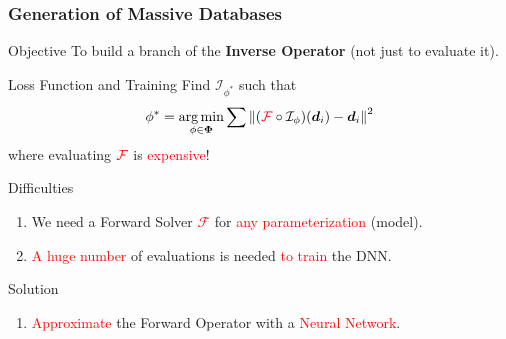 \begin{frame}
    \frametitle{Generation of Massive Databases}    
\vspace{-2mm}

\begin{block}{Objective}
	\centering
	To build a branch of the \textbf{Inverse Operator} (not just to evaluate it).
\end{block}

\begin{block}{Loss Function and Training}
Find $\mathcal{I}_{\phi^*}$ such that
\[
\phi^* = \operatorname*{arg\,min}_{\phi \in \boldsymbol{\Phi}} \sum \left\| (\textcolor{red}{\mathcal{F}} \circ \mathcal{I}_{\phi})(\boldsymbol{d}_i) - \boldsymbol{d}_i \right\|^2
\]
where evaluating $\textcolor{red}{\mathcal{F}}$ is \textcolor{red}{expensive}!
\end{block}
    
\begin{block}{Difficulties}
    \begin{enumerate}
        \item We need a Forward Solver \textcolor{red}{$\mathcal{F}$} for \textcolor{red}{any parameterization} (model).
        \item \textcolor{red}{A huge number} of evaluations is needed \textcolor{red}{to train} the DNN.
    \end{enumerate}
\end{block}

\begin{block}{Solution}
    \begin{enumerate}
        \item  \textcolor{red}{Approximate} the Forward Operator with a  \textcolor{red}{Neural Network}.
    \end{enumerate}
\end{block}

\end{frame}
